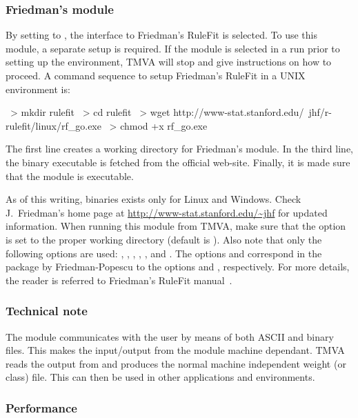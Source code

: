 \subsubsection{Friedman's module}
\label{sec:friedman}
By setting  to , the interface to Friedman's RuleFit 
is selected. To use this module, a separate setup is required. If the module is selected 
in a run prior to setting up the environment, TMVA will stop and give instructions on how 
to proceed. A command sequence to setup Friedman's RuleFit in a UNIX environment is:
\begin{codeexample}
\begin{tmvacode}
~> mkdir rulefit
~> cd rulefit
~> wget http://www-stat.stanford.edu/~jhf/r-rulefit/linux/rf_go.exe
~> chmod +x rf_go.exe
\end{tmvacode}
\caption[.]{\codeexampleCaptionSize The first line creates a working directory 
            for Friedman's module. In the third line, the binary executable is fetched 
            from the official web-site. Finally, it is made sure that the module
            is executable.}
\end{codeexample}
As of this writing, binaries exists only for Linux and Windows. Check J.~Friedman's 
home page at \url{http://www-stat.stanford.edu/~jhf} for updated information.
When running this module from TMVA, make sure that the option 
is set to the proper working directory (default is ).
Also note that only the following options are used:
, , , , 
,  and . The options  and  correspond in the package by Friedman-Popescu to the options  and , respectively. For more details, the reader is referred to Friedman's RuleFit manual~\cite{RuleFitWeb}. 

\subsubsection*{Technical note}
The module  communicates with the user by means of both ASCII and 
binary files. This makes the input/output from the module machine dependant. TMVA 
reads the output from  and produces the normal machine independent 
weight (or class) file. This can then be used in other applications and environments.

\subsubsection{Performance}

